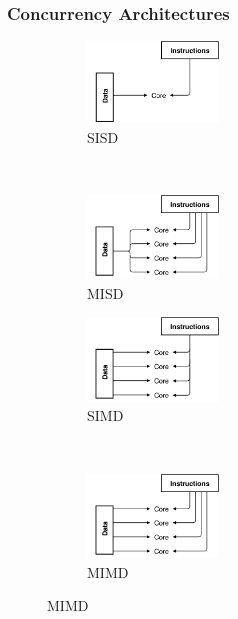 \documentclass{beamer}
\begin{document}
\begin{frame}
\frametitle{Concurrency Architectures}
 \begin{figure}
        \centering
        \begin{subfigure}[b]{0.48\textwidth}
                \includegraphics[width=3.5cm]{../SISD}
                \caption*{SISD}
        \end{subfigure}%
        ~
        \begin{subfigure}[b]{0.48\textwidth}
                \includegraphics[width=3.5cm]{../MISD}
                \caption*{MISD}
        \end{subfigure}

        \begin{subfigure}[b]{0.48\textwidth}
                \includegraphics[width=3.5cm]{../SIMD}
                \caption*{SIMD}
        \end{subfigure}
        ~
        \begin{subfigure}[b]{0.48\textwidth}
                \includegraphics[width=3.5cm]{../MIMD}
                \caption*{MIMD}
        \end{subfigure}
\end{figure}
\end{frame}
\end{document}

